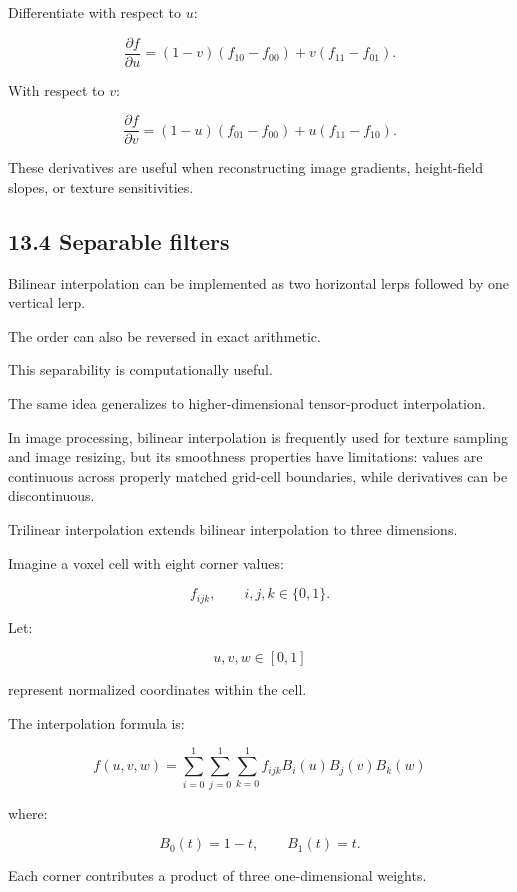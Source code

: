 \hypertarget{02-foundations-ii-ch028-derivatives}{}

Differentiate with respect to \(u\):

\[ \boxed{ \frac{\partial f}{\partial u} = (1-v)(f_{10}-f_{00}) + v(f_{11}-f_{01}) }. \]

With respect to \(v\):

\[ \boxed{ \frac{\partial f}{\partial v} = (1-u)(f_{01}-f_{00}) + u(f_{11}-f_{10}) }. \]

These derivatives are useful when reconstructing image gradients, height-field slopes, or texture sensitivities.

\subsection{13.4 Separable filters}\label{02-foundations-ii-ch028-separable-filters}

\hypertarget{02-foundations-ii-ch028-separable-filters}{}

Bilinear interpolation can be implemented as two horizontal lerps followed by one vertical lerp.

The order can also be reversed in exact arithmetic.

This separability is computationally useful.

The same idea generalizes to higher-dimensional tensor-product interpolation.

In image processing, bilinear interpolation is frequently used for texture sampling and image resizing, but its smoothness properties have limitations: values are continuous across properly matched grid-cell boundaries, while derivatives can be discontinuous.

Trilinear interpolation extends bilinear interpolation to three dimensions.

Imagine a voxel cell with eight corner values:

\[ f_{ijk}, \qquad i,j,k\in\{0,1\}. \]

Let:

\[ u,v,w\in[0,1] \]

represent normalized coordinates within the cell.

The interpolation formula is:

\[ \boxed{ f(u,v,w)= \sum_{i=0}^{1} \sum_{j=0}^{1} \sum_{k=0}^{1} f_{ijk} B_i(u)B_j(v)B_k(w) } \]

where:

\[ B_0(t)=1-t, \qquad B_1(t)=t. \]

Each corner contributes a product of three one-dimensional weights.


